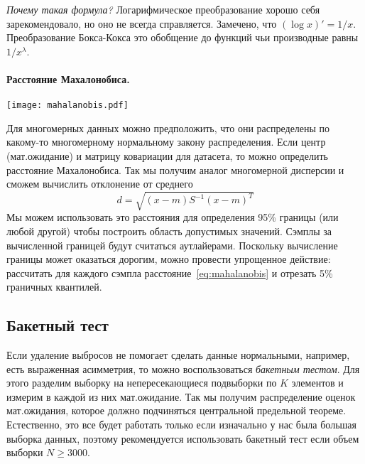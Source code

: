 \documentclass[../handbook.tex]{subfiles}
\begin{document}
{\it Почему такая формула?} Логарифмическое преобразование хорошо себя
зарекомендовало, но оно не всегда справляется. Замечено, что $(\log x)' =
1/x$. Преобразование Бокса-Кокса это обобщение до функций чьи производные
равны $1/x^\lambda$.

\paragraph{Расстояние Махалонобиса.}
\begin{marginfigure}
    \texttt{[image: mahalanobis.pdf]}
\end{marginfigure}
Для многомерных данных можно предположить, что они распределены по какому-то многомерному нормальному закону распределения. Если центр (мат.ожидание) и матрицу ковариации для датасета, то можно определить расстояние Махалонобиса. Так мы получим аналог много\-мерной дисперсии и сможем вычислить отклонение от среднего
\begin{equation}
    \label{eq:mahalanobis}
    d = \sqrt{ (x - m) S^{-1}(x-m)^T}
\end{equation}
Мы можем использовать это расстояния для определения 95\% границы (или любой другой) чтобы построить область допустимых значений. Сэмплы за вычисленной границей будут считаться аутлайерами. Поскольку вычисление границы может оказаться дорогим, можно провести упрощенное действие: рассчитать для каждого сэмпла расстояние~\ref{eq:mahalanobis} и отрезать 5\% граничных квантилей.

\subsection{Бакетный тест}

Если удаление выбросов не помогает сделать данные нормальными, например, есть выраженная асимметрия, то можно воспользоваться \emph{бакетным тестом}. Для этого разделим выборку на непересекающиеся подвыборки по $K$ элементов и измерим в каждой из них мат.ожидание. Так мы получим распределение оценок мат.ожидания, которое должно подчиняться центральной предельной теореме. Естественно, это все будет работать только если изначально у нас была большая выборка данных, поэтому рекомендуется использовать бакетный тест если объем выборки $N \geq 3000$.
\end{document}
